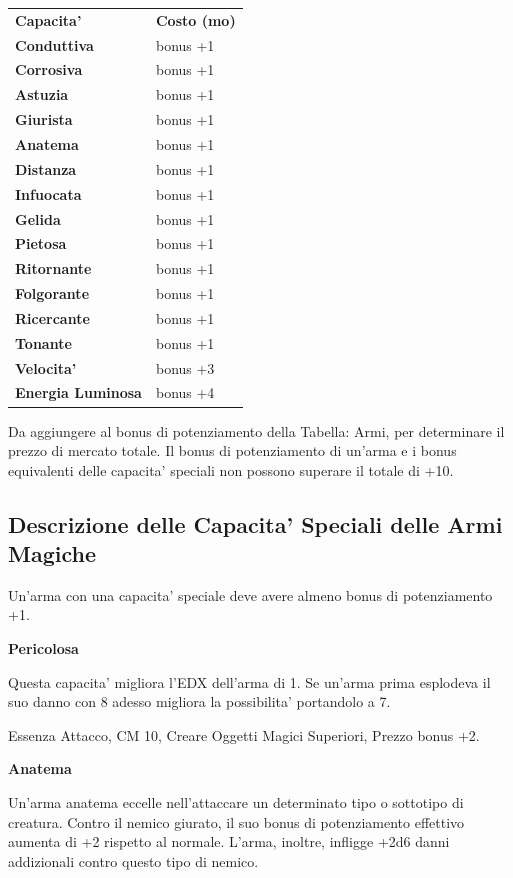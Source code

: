 \documentclass[a4paper,11pt,twoside,openany]{book}
\begin{document}
\label{tabella-capacita-speciali-delle-armi-a-distanza}

\begin{tabular}{ll}
\toprule
\textbf{Capacita'} & \textbf{Costo (mo)}\tabularnewline
\textbf{Conduttiva} \index{Conduttiva}& bonus +1\tabularnewline
\textbf{Corrosiva}\index{Corrosiva} & bonus +1\tabularnewline
\textbf{Astuzia} \index{Astuzia} & bonus +1\tabularnewline
\textbf{Giurista}\index{Giurista} & bonus +1\tabularnewline
\textbf{Anatema} \index{Anatema} & bonus +1\tabularnewline
\textbf{Distanza}\index{Distanza} & bonus +1\tabularnewline
\textbf{Infuocata}\index{Infuocata} & bonus +1\tabularnewline
\textbf{Gelida} \index{Gelida}& bonus +1\tabularnewline
\textbf{Pietosa} \index{Pietosa}& bonus +1\tabularnewline
\textbf{Ritornante} \index{Ritornante}& bonus +1\tabularnewline
\textbf{Folgorante}\index{Folgorante} & bonus +1\tabularnewline
\textbf{Ricercante} \index{Ricercante} & bonus +1\tabularnewline
\textbf{Tonante} \index{Tonante}& bonus +1\tabularnewline
\textbf{Velocita'} \index{Velocita'} & bonus +3\tabularnewline
\textbf{Energia Luminosa}\index{Energia Luminosa} & bonus +4\tabularnewline

\end{tabular}

\bigskip

Da aggiungere al bonus di potenziamento della Tabella: Armi, per determinare
il prezzo di mercato totale. Il bonus di potenziamento di un'arma
e i bonus equivalenti delle capacita' speciali non possono superare
il totale di +10.

\subsection{Descrizione delle Capacita' Speciali delle Armi Magiche}

\label{descrizione-delle-capacita-speciali-delle-armi-magiche}

Un'arma con una capacita' speciale deve avere almeno bonus di potenziamento +1.

\textbf{Pericolosa}

Questa capacita' migliora l'EDX dell'arma di 1. Se un'arma prima esplodeva il suo danno con 8 adesso migliora la possibilita' portandolo a 7.

Essenza Attacco, CM 10, Creare Oggetti Magici Superiori, Prezzo bonus +2.

\textbf{Anatema}

Un'arma anatema eccelle nell'attaccare un determinato tipo o sottotipo di creatura. Contro il nemico giurato, il suo bonus di potenziamento effettivo aumenta di +2 rispetto al normale. L'arma, inoltre, infligge +2d6 danni addizionali contro questo tipo di nemico. 
\end{document}
